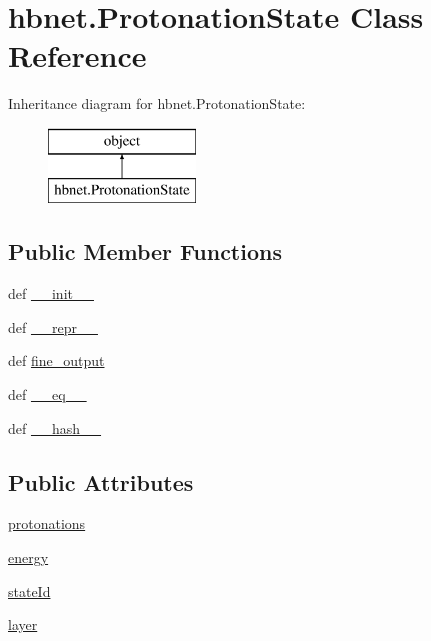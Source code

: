\hypertarget{classhbnet_1_1_protonation_state}{\section{hbnet.\-Protonation\-State Class Reference}
\label{classhbnet_1_1_protonation_state}
}
Inheritance diagram for hbnet.\-Protonation\-State\-:\begin{figure}[H]
\begin{center}
\leavevmode
\includegraphics[height=2.000000cm]{classhbnet_1_1_protonation_state}
\end{center}
\end{figure}
\subsection*{Public Member Functions}
\begin{DoxyCompactItemize}
\item 
def \hyperlink{classhbnet_1_1_protonation_state_abdfb60e45a03e32d9886bc5ff8827691}{\-\_\-\-\_\-init\-\_\-\-\_\-}
\item 
def \hyperlink{classhbnet_1_1_protonation_state_a040bd1e1d4173a65e25cd4a9e03249bf}{\-\_\-\-\_\-repr\-\_\-\-\_\-}
\item 
def \hyperlink{classhbnet_1_1_protonation_state_a54dace9b5675cce97602e16cd5fc470d}{fine\-\_\-output}
\item 
def \hyperlink{classhbnet_1_1_protonation_state_a5f9af2e8ab2e67d0ea3c90c38314de1d}{\-\_\-\-\_\-eq\-\_\-\-\_\-}
\item 
def \hyperlink{classhbnet_1_1_protonation_state_ae8199e36ef01969fc5515c845b5fe078}{\-\_\-\-\_\-hash\-\_\-\-\_\-}
\end{DoxyCompactItemize}
\subsection*{Public Attributes}
\begin{DoxyCompactItemize}
\item 
\hyperlink{classhbnet_1_1_protonation_state_af3ba85dacb1001aaa694dd539eabfecc}{protonations}
\item 
\hyperlink{classhbnet_1_1_protonation_state_afa6daa253fcebb9a9707a139e11da56d}{energy}
\item 
\hyperlink{classhbnet_1_1_protonation_state_ad5303a482661dbcf70bce07ff287079b}{state\-Id}
\item 
\hyperlink{classhbnet_1_1_protonation_state_a1090fe1738d0d790e2e1dbf75d60249b}{layer}
\end{DoxyCompactItemize}
